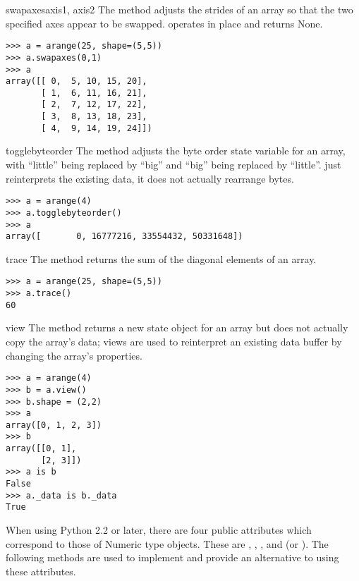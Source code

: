 \begin{methoddesc}[numarray]{swapaxes}{axis1, axis2}
  \label{arraymethod:swapaxes}
  The  method adjusts the strides of an array so that
  the two specified axes appear to be swapped.   operates
  in place and returns None.
\begin{verbatim}
>>> a = arange(25, shape=(5,5))
>>> a.swapaxes(0,1)
>>> a
array([[ 0,  5, 10, 15, 20],
       [ 1,  6, 11, 16, 21],
       [ 2,  7, 12, 17, 22],
       [ 3,  8, 13, 18, 23],
       [ 4,  9, 14, 19, 24]])
\end{verbatim}
\end{methoddesc}


\begin{methoddesc}[numarray]{togglebyteorder}{}
  \label{arraymethod:togglebyteorder}
  The  method adjusts the byte order state 
  variable for an array, with ``little'' being replaced by ``big'' and ``big''
  being replaced by ``little''.   just reinterprets
  the existing data, it does not actually rearrange bytes.
\begin{verbatim}
>>> a = arange(4)
>>> a.togglebyteorder()
>>> a
array([       0, 16777216, 33554432, 50331648])
\end{verbatim}
\end{methoddesc}

\begin{methoddesc}[numarray]{trace}{}
  \label{arraymethod:togglebyteorder}
  The  method returns the sum of the diagonal elements
  of an array.
\begin{verbatim}
>>> a = arange(25, shape=(5,5))
>>> a.trace()
60
\end{verbatim}
\end{methoddesc}


\begin{methoddesc}[numarray]{view}{}
  \label{arraymethod:view} The  method returns a new
  state object for an array but does not actually copy the array's
  data; views are used to reinterpret an existing data buffer by 
  changing the array's properties.
\begin{verbatim}
>>> a = arange(4)
>>> b = a.view()
>>> b.shape = (2,2)
>>> a
array([0, 1, 2, 3])
>>> b
array([[0, 1],
       [2, 3]])
>>> a is b
False
>>> a._data is b._data
True
\end{verbatim}
\end{methoddesc}


When using Python 2.2 or later, there are four public attributes which
correspond to those of Numeric type objects. These are ,
, , and  (or ). The
following methods are used to implement and provide an alternative to using
these attributes.


